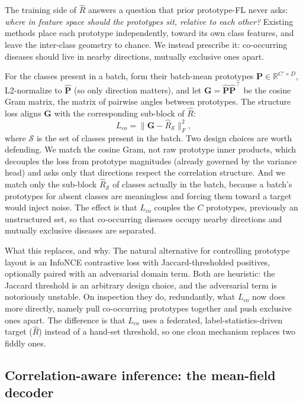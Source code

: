 \documentclass[11pt,a4paper]{article}
\theoremstyle{definition}
\newcommand{\Rhat}{\widehat{R}}
\begin{document}
The training side of $\Rhat$ answers a question that prior prototype-FL never asks: \emph{where in feature space should the prototypes sit, relative to each other?} Existing methods place each prototype independently, toward its own class features, and leave the inter-class geometry to chance. We instead prescribe it: co-occurring diseases should live in nearby directions, mutually exclusive ones apart.

For the classes present in a batch, form their batch-mean prototypes $\mathbf{P}\in\mathbb{R}^{C'\times D}$, L2-normalize to $\hat{\mathbf{P}}$ (so only direction matters), and let $\mathbf{G}=\hat{\mathbf{P}}\hat{\mathbf{P}}^{\top}$ be the cosine Gram matrix, the matrix of pairwise angles between prototypes. The structure loss aligns $\mathbf{G}$ with the corresponding sub-block of $\Rhat$:
\begin{equation}
L_{co}=\big\|\mathbf{G}-\Rhat_{\mathcal{S}}\big\|_F^{2},
\label{eq:lco}
\end{equation}
where $\mathcal{S}$ is the set of classes present in the batch. Two design choices are worth defending. We match the cosine Gram, not raw prototype inner products, which decouples the loss from prototype magnitudes (already governed by the variance head) and asks only that directions respect the correlation structure. And we match only the sub-block $\Rhat_{\mathcal{S}}$ of classes actually in the batch, because a batch's prototypes for absent classes are meaningless and forcing them toward a target would inject noise. The effect is that $L_{co}$ couples the $C$ prototypes, previously an unstructured set, so that co-occurring diseases occupy nearby directions and mutually exclusive diseases are separated.

What this replaces, and why. The natural alternative for controlling prototype layout is an InfoNCE contrastive loss with Jaccard-thresholded positives, optionally paired with an adversarial domain term. Both are heuristic: the Jaccard threshold is an arbitrary design choice, and the adversarial term is notoriously unstable. On inspection they do, redundantly, what $L_{co}$ now does more directly, namely pull co-occurring prototypes together and push exclusive ones apart. The difference is that $L_{co}$ uses a federated, label-statistics-driven target ($\Rhat$) instead of a hand-set threshold, so one clean mechanism replaces two fiddly ones.

\subsection{Correlation-aware inference: the mean-field decoder}
\label{sec:decoder}
\end{document}

